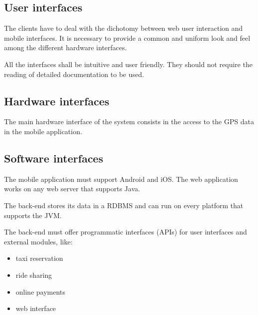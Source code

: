 \subsection{User interfaces}
The clients have to deal with the dichotomy between web user interaction and mobile interfaces.
It is necessary to provide a common and uniform look and feel among the different hardware interfaces.

All the interfaces shall be intuitive and user friendly. They should not require the reading of detailed documentation to be used.

\subsection{Hardware interfaces}

The main hardware interface of the system consists in the access to the GPS data in the mobile application.

\subsection{Software interfaces}
The mobile application must support Android and iOS.
The web application works on any web server that supports Java.

The back-end stores its data in a RDBMS and  can run on every platform that supports the JVM.

The back-end must offer programmatic interfaces (APIs) for user interfaces and external modules, like:
\begin{itemize}
\item taxi reservation
\item ride sharing
\item online payments
\item web interface
\end{itemize}
